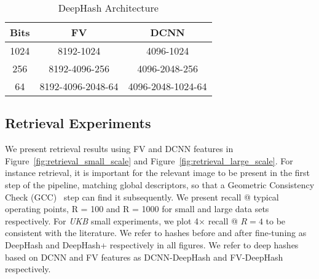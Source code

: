 \documentclass[10pt,twocolumn,letterpaper]{article}
\begin{document}
\begin{table}
\centering
\begin{tabular}{|c|c|c|}
\hline
Bits 		& 	FV  				& 	DCNN  			\\
\hline
1024 		& 	8192-1024 			& 	4096-1024 		\\
\hline
256 		& 	8192-4096-256 		& 	4096-2048-256 		\\
\hline
64 			& 	8192-4096-2048-64 	& 	4096-2048-1024-64 		\\
\hline
\end{tabular}
\caption{DeepHash Architecture}
\label{tab:rbm_params}
\end{table}






\subsection{Retrieval Experiments}
\label{sec:retrieval_results}

We present retrieval results using FV and DCNN features in Figure~\ref{fig:retrieval_small_scale} and Figure~\ref{fig:retrieval_large_scale}.
For instance retrieval, it is important for the relevant image to be present in the first step of the pipeline, matching global descriptors, so that a Geometric Consistency Check (GCC)~\cite{Fischler81} step can find it subsequently. 
We present recall @ typical operating points, R = 100 and R = 1000 for small and large data sets respectively. 
For {\it UKB} small experiments, we plot 4$\times$ recall @ $R=4$ to be consistent with the literature.
We refer to hashes before and after fine-tuning as DeepHash and DeepHash+ respectively in all figures.
We refer to deep hashes based on DCNN and FV features as DCNN-DeepHash and FV-DeepHash respectively.
\end{document}

